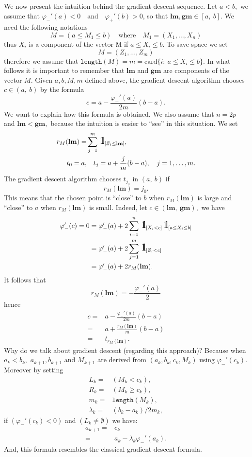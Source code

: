 \documentclass[
  11pt,
  a4paper,
]{article}
\newcommand\indica{\,\rlap{{\rm \Large 1}}\kern.30em \mbox{\rm \Large l}}
\begin{document}
We now present the intuition behind the gradient descent sequence. Let $a<b,$ we assume that $\varphi_{-}'(a)<0 \quad\text{and}\quad \varphi_{+}'(b)>0$,
so that $\mathbf{lm}, \mathbf{gm}\in [a,\ b].$  We need the following notations
\[
M=(a\leq M_1\leq b)\quad\text{where}\quad M_1=(X_1,\ldots,X_n)
\] 
thus $X_i$ is a component of the vector M if $a\leq X_i\leq b$. To save space we set
\[
M=(Z_1,\ldots,Z_m)
\]
therefore we assume that $\mathtt{length}(M)=m=\mathrm{card}\{i:\ a\leq X_i\leq b\}.$ In what follows it is
important to remember that $\mathbf{lm}$ and $\mathbf{gm}$ are components of the vector $M.$
Given $a,b,M,m$ defined above, the gradient descent
algorithm chooses $c\in(a,\ b)$ by the formula
\[
c= a -\frac{\varphi_{-}'(a)}{2m} (b-a).
\]
We want to explain how this formula is obtained. We also assume that $n=2p$ and $\mathbf{lm}<\mathbf{gm},$ because
the intuition is easier to ``see'' in this situation. We set
\begin{align*}
	r_M(\mathbf{lm})= & \sum_{j=1}^m\indica_{[Z_i \leq \mathbf{lm} ]},\\
	t_0=a, & \quad t_j=a+ \frac{j}{m}(b-a),\quad j=1,\ldots,m.
\end{align*}
The gradient descent algorithm chooses $t_{j_0}$ in $(a,\ b)$ if
\[
r_M(\mathbf{lm})=j_0.
\]
This means that the chosen point is ``close'' to $b$ when $r_M(\mathbf{lm})$ is large and ``close'' to $a$
when $r_M(\mathbf{lm})$ is small. Indeed,  let $c\in (\mathbf{lm},\  \mathbf{gm}),$ we have
\begin{align*}
	\varphi_{-}'(c)=0 &=\varphi_{-}'(a)+2\sum_{i=1}^n \indica_{[X_i <c]} \indica_{[a\leq X_i \leq b]}\\
	&=\varphi_{-}'(a)+2\sum_{j=1}^m \indica_{[Z_i <c]}\\ 
	&=\varphi_{-}'(a)+2 r_M(\mathbf{lm}). 
\end{align*}
It follows that
\[
r_M(\mathbf{lm})=-\frac{\varphi_{-}'(a)}{2}
\]
hence
\begin{align*}
	c= & a -\frac{\varphi_{-}'(a)}{2m} (b-a)\\
	= & a+\frac{r_M(\mathbf{lm})}{m}(b-a)\\
	= & t_{r_M(\mathbf{lm})}.
\end{align*}
Why do we talk about gradient descent (regarding this approach)? Because when $a_k<b_k,$ $a_{k+1},b_{k+1}$ and $M_{k+1}$
are derived from $\left(a_k,b_k,c_k,M_k \right)$ using $\varphi_{-}'(c_k).$ Moreover by setting
\begin{align*}
	L_k=& (M_k<c_k),\\
	R_k= &(M_k\geq c_k),\\
	m_k=&\mathtt{length}(M_k),\\
	\lambda_k=&(b_k-a_k)/2m_k,
\end{align*}
if $(\varphi_{-}'(c_k)<0)$ and $(L_k\neq \emptyset)$ we have:
\begin{align*}
	a_{k+1}=& c_k\\
	= & a_k-\lambda_k \varphi_{-}'(a_k).
\end{align*}
And, this formula resembles the classical gradient descent formula.\par\medspace
\end{document}
